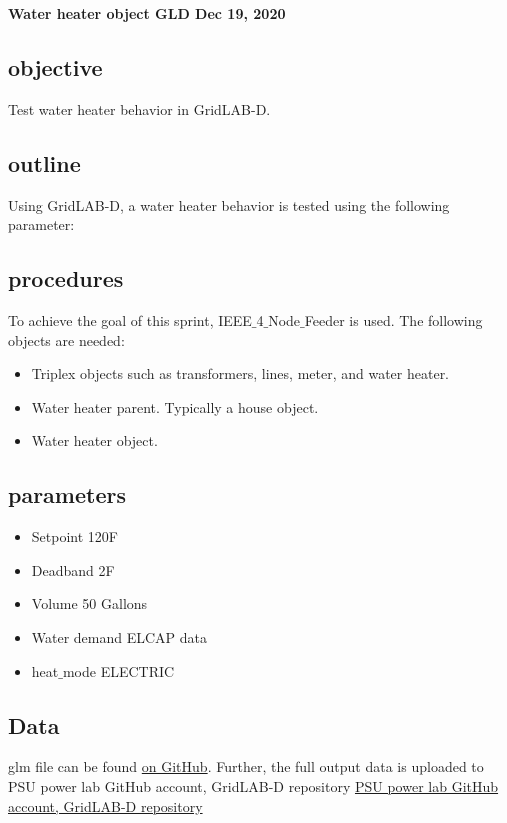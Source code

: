 \textbf{Water heater object GLD Dec 19, 2020}
\subsection{objective}

    
    Test water heater behavior in GridLAB-D.
    
\subsection{outline}
    
    Using GridLAB-D, a water heater behavior is tested using the following parameter:
\subsection{procedures}
    
    To achieve the goal of this sprint, IEEE$\_$4$\_$Node$\_$Feeder is used. The following objects are needed:
    \begin{itemize}
        \item Triplex objects such as transformers, lines, meter, and water heater.
        \item Water heater parent. Typically a house object.
        \item Water heater object.
    \end{itemize}
    
\subsection{parameters}
    
    \begin{itemize}
        \item Setpoint 120F
        \item Deadband 2F
        \item Volume 50 Gallons
        \item Water demand ELCAP data
        \item heat$\_$mode ELECTRIC
    \end{itemize}
    
\subsection{Data}
    glm file can be found \href{https://github.com/psu-powerlab/GridLab-D/blob/master/NeoChargeProject/WH_4_Node_Feeder/Uncontrolled_WH/WH_4_node.glm}{on GitHub}. Further, the full output data is uploaded to PSU power lab GitHub account, GridLAB-D repository \href{https://github.com/MidrarAdham/GridLab-D/blob/master/NeoChargeProject/WH_4_Node_feeder/Water_heater/wh_1.csv}{PSU power lab GitHub account, GridLAB-D repository}
    

